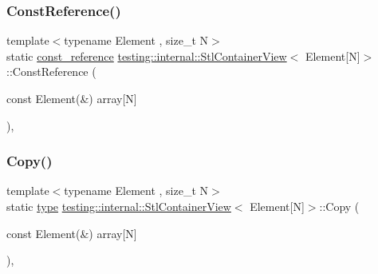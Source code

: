 \mbox{\label{classtesting_1_1internal_1_1_stl_container_view_3_01_element[_n]_4_aa1b15d7f43d38751ae19f6dbdcb6aba3}} 
\subsubsection{\texorpdfstring{ConstReference()}{ConstReference()}\hspace{0.1cm}{\footnotesize\ttfamily [3/3]}}
{\footnotesize\ttfamily template$<$typename Element , size\+\_\+t N$>$ \\
static \mbox{\hyperlink{classtesting_1_1internal_1_1_stl_container_view_3_01_element[_n]_4_a481e6ab99316939484fad9c561af5e28}{const\+\_\+reference}} \mbox{\hyperlink{classtesting_1_1internal_1_1_stl_container_view}{testing\+::internal\+::\+Stl\+Container\+View}}$<$ Element\mbox{[}N\mbox{]}$>$\+::Const\+Reference (\begin{DoxyParamCaption}\item[{const Element(\&)}]{array\mbox{[}\+N\mbox{]} }\end{DoxyParamCaption})\hspace{0.3cm}{\ttfamily [inline]}, {\ttfamily [static]}}

\mbox{\label{classtesting_1_1internal_1_1_stl_container_view_3_01_element[_n]_4_af2cf79fbd7f829229a47b52f863c68f8}} 
\subsubsection{\texorpdfstring{Copy()}{Copy()}\hspace{0.1cm}{\footnotesize\ttfamily [1/3]}}
{\footnotesize\ttfamily template$<$typename Element , size\+\_\+t N$>$ \\
static \mbox{\hyperlink{classtesting_1_1internal_1_1_stl_container_view_3_01_element[_n]_4_a364efca99cc5a02829b4e3413c506b09}{type}} \mbox{\hyperlink{classtesting_1_1internal_1_1_stl_container_view}{testing\+::internal\+::\+Stl\+Container\+View}}$<$ Element\mbox{[}N\mbox{]}$>$\+::Copy (\begin{DoxyParamCaption}\item[{const Element(\&)}]{array\mbox{[}\+N\mbox{]} }\end{DoxyParamCaption})\hspace{0.3cm}{\ttfamily [inline]}, {\ttfamily [static]}}

